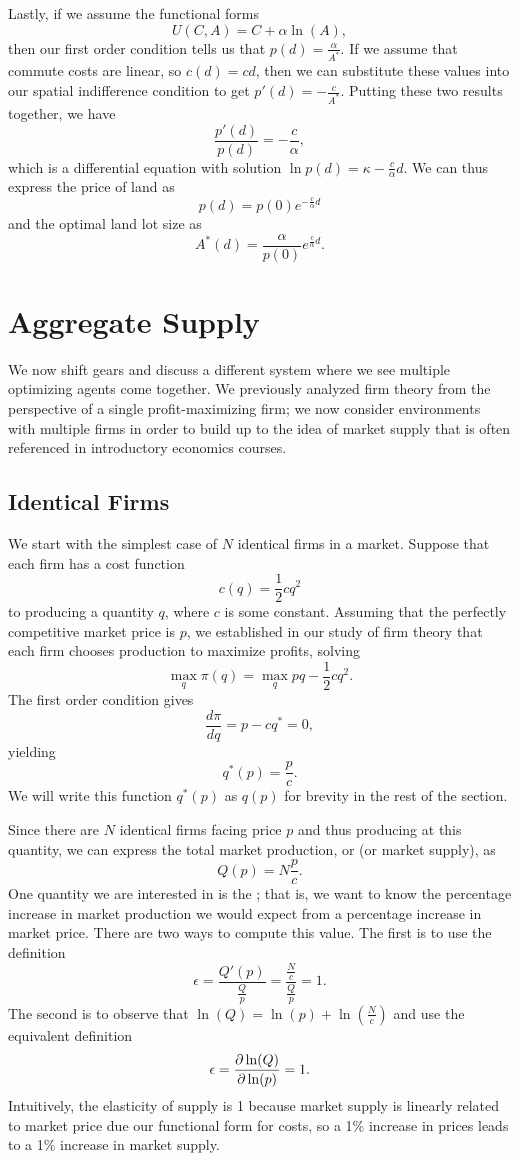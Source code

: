 Lastly, if we assume the functional forms
$$U(C, A) = C + \alpha \ln(A),$$
then our first order condition tells us that $p(d) = \frac{\alpha}{A^*}.$
If we assume that commute costs are linear, so $c(d) = cd$, then we can substitute these values into our spatial indifference condition to get 
$p'(d) = -\frac{c}{A^*}.$
Putting these two results together, we have
$$\frac{p'(d)}{p(d)} = -\frac{c}{\alpha},$$
which is a differential equation with solution $\ln p(d) = \kappa - \frac{c}{\alpha} d.$
We can thus express the price of land as 
$$p(d) = p(0)e^{-\frac{c}{\alpha}d}$$
and the optimal land lot size as
$$A^*(d) = \frac{\alpha}{p(0)}e^{\frac{c}{\alpha}d}.$$

\section{Aggregate Supply}
We now shift gears and discuss a different system where we see multiple optimizing agents come together. We previously analyzed firm theory from the perspective of a single profit-maximizing firm; we now consider environments with multiple firms in order to build up to the idea of market supply that is often referenced in introductory economics courses.

\subsection*{Identical Firms}
We start with the simplest case of $N$ identical firms in a market. Suppose that each firm has a cost function
$$c(q) = \frac{1}{2}cq^2$$
to producing a quantity $q$, where $c$ is some constant. Assuming that the perfectly competitive market price is $p$, we established in our study of firm theory that each firm chooses production to maximize profits, solving
$$\max_q \pi(q) = \max_q pq - \frac{1}{2}cq^2.$$
The first order condition gives
$$\frac{d\pi}{dq} = p - cq^* = 0,$$
yielding
$$q^*(p) = \frac{p}{c}.$$
We will write this function $q^*(p)$ as $q(p)$ for brevity in the rest of the section.

Since there are $N$ identical firms facing price $p$ and thus producing at this quantity, we can express the total market production, or  (or market supply), as 
$$Q(p) = N\frac{p}{c}.$$
One quantity we are interested in is the ; that is, we want to know the percentage increase in market production we would expect from a percentage increase in market price. There are two ways to compute this value. The first is to use the definition
$$\epsilon = \frac{Q'(p)}{\frac{Q}{p}} = \frac{\frac{N}{c}}{\frac{Q}{p}} = 1.$$
The second is to observe that $\ln(Q) = \ln(p) + \ln(\frac{N}{c})$ and use the equivalent definition
$$\epsilon = \pdv{\ln(Q)}{\ln(p)} = 1.$$
Intuitively, the elasticity of supply is 1 because market supply is linearly related to market price due our functional form for costs, so a 1\% increase in prices leads to a 1\% increase in market supply.


